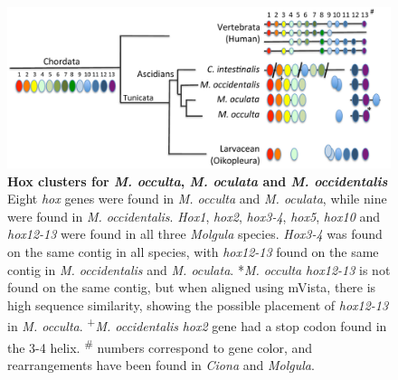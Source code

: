 \begin{figure}[tbp]
\centering
\includegraphics[scale=0.65]{figures/hox.pdf}
\caption{\textbf{Hox clusters for \textit{M. occulta}, \textit{M. oculata} and \textit{M. occidentalis}} Eight \textit{hox} genes were found in  \textit{M. occulta} and \textit{M. oculata}, while nine were found in \textit{M. occidentalis}. \textit{Hox1}, \textit{hox2}, \textit{hox3-4}, \textit{hox5}, \textit{hox10} and \textit{hox12-13} were found in all three \textit{Molgula} species. \textit{Hox3-4} was found on the same contig in all species, with \textit{hox12-13} found on the same contig in \textit{M. occidentalis} and \textit{M. oculata}. *\textit{M. occulta} \textit{hox12-13} is not found on the same contig, but when aligned using mVista, there is high sequence similarity, showing the possible placement of \textit{hox12-13} in \textit{M. occulta}. \textsuperscript{+}\textit{M. occidentalis} \textit{hox2} gene had a stop codon found in the 3-4 helix. \textsuperscript{\#} numbers correspond to gene color, and rearrangements have been found in \textit{Ciona} and \textit{Molgula}.}
\label{fig:hoxcluster}
\end{figure}

